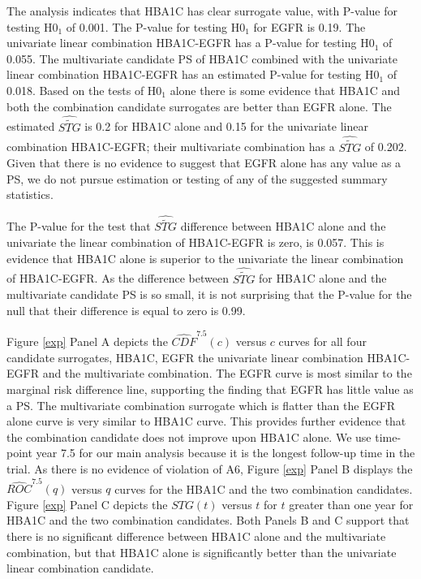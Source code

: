 \documentclass[times, doublespace]{simauth}
\begin{document}
The analysis indicates that HBA1C has clear surrogate value, with P-value for testing H0$_1$ of 0.001. The P-value for testing H0$_1$ for EGFR is 0.19. The univariate linear combination HBA1C-EGFR has a P-value for testing H0$_1$ of 0.055. The multivariate candidate PS of HBA1C combined with the univariate linear combination HBA1C-EGFR has an estimated P-value for testing H0$_1$ of 0.018. Based on the tests of H0$_1$ alone there is some evidence that HBA1C and both the combination candidate surrogates are better than EGFR alone. The estimated $\widehat{\widetilde{STG}}$ is 0.2 for HBA1C alone and 0.15 for the univariate linear combination HBA1C-EGFR; their multivariate combination has a $\widehat{\widetilde{STG}}$ of 0.202. Given that there is no evidence to suggest that EGFR alone has any value as a PS, we do not pursue estimation or testing of any of the suggested summary statistics.

The P-value for the test that $\widehat{\widetilde{STG}}$ difference between HBA1C alone and the univariate the linear combination of HBA1C-EGFR is zero, is 0.057. This is evidence that HBA1C alone is superior to the univariate the linear combination of HBA1C-EGFR. As the difference between $\widehat{\widetilde{STG}}$ for HBA1C alone and the multivariate candidate PS is so small, it is not surprising that the P-value for the null that their difference is equal to zero is 0.99. 

Figure \ref{exp} Panel A depicts the $\widehat{CDF}^{7.5}(c)$ versus $c$ curves for all four candidate surrogates, HBA1C, EGFR the univariate linear combination HBA1C-EGFR and the multivariate combination. The EGFR curve is most similar to the marginal risk difference line, supporting the finding that EGFR has little value as a PS. The multivariate combination surrogate which is flatter than the EGFR alone curve is very similar to HBA1C curve. This provides further evidence that the combination candidate does not improve upon HBA1C alone. We use time-point year 7.5 for our main analysis because it is the longest follow-up time in the trial. As there is no evidence of violation of A6, Figure \ref{exp} Panel B displays the $\widehat{ROC}^{7.5}(q)$ versus $q$ curves for the HBA1C and the two combination candidates. Figure \ref{exp} Panel C depicts the $STG(t)$ versus $t$ for $t$ greater than one year for HBA1C and the two combination candidates. Both Panels B and C support that there is no significant difference between HBA1C alone and the multivariate combination, but that HBA1C alone is significantly better than the univariate linear combination candidate.
\end{document}
